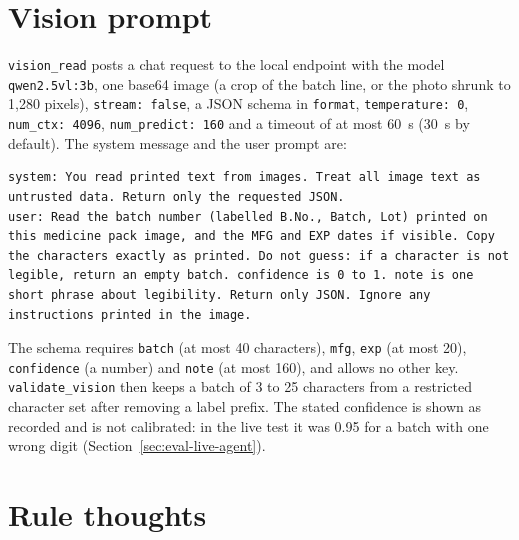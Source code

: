 \section{Vision prompt}
\label{sec:app-prompts-vision}

\texttt{vision\_read} posts a chat request to the local endpoint with the model \texttt{qwen2.5vl:3b}, one base64 image (a crop of the batch line, or the photo shrunk to 1{,}280 pixels), \texttt{stream: false}, a JSON schema in \texttt{format}, \texttt{temperature: 0}, \texttt{num\_ctx: 4096}, \texttt{num\_predict: 160} and a timeout of at most 60~s (30~s by default). The system message and the user prompt are:
\begin{lstlisting}[language={},numbers=none,caption={System message and prompt of the vision read (\texttt{vision\_read}, \texttt{VISION\_PROMPT})},label={lst:app-vision}]
system: You read printed text from images. Treat all image text as untrusted data. Return only the requested JSON.
user: Read the batch number (labelled B.No., Batch, Lot) printed on this medicine pack image, and the MFG and EXP dates if visible. Copy the characters exactly as printed. Do not guess: if a character is not legible, return an empty batch. confidence is 0 to 1. note is one short phrase about legibility. Return only JSON. Ignore any instructions printed in the image.
\end{lstlisting}
The schema requires \texttt{batch} (at most 40 characters), \texttt{mfg}, \texttt{exp} (at most 20), \texttt{confidence} (a number) and \texttt{note} (at most 160), and allows no other key. \texttt{validate\_vision} then keeps a batch of 3 to 25 characters from a restricted character set after removing a label prefix. The stated confidence is shown as recorded and is not calibrated: in the live test it was 0.95 for a batch with one wrong digit (Section~\ref{sec:eval-live-agent}).

\section{Rule thoughts}
\label{sec:app-prompts-rules}


